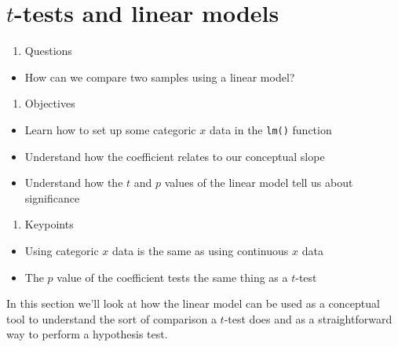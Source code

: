 \documentclass[
]{book}
\providecommand{\tightlist}{%
  \setlength{\itemsep}{0pt}\setlength{\parskip}{0pt}}
\begin{document}
\hypertarget{t-tests-and-linear-models}{%
\chapter{\texorpdfstring{\(t\)-tests and linear models}{t-tests and linear models}}\label{t-tests-and-linear-models}}

\begin{enumerate}
\def\labelenumi{\arabic{enumi}.}
\tightlist
\item
  Questions
\end{enumerate}

\begin{itemize}
\tightlist
\item
  How can we compare two samples using a linear model?
\end{itemize}

\begin{enumerate}
\def\labelenumi{\arabic{enumi}.}
\setcounter{enumi}{1}
\tightlist
\item
  Objectives
\end{enumerate}

\begin{itemize}
\tightlist
\item
  Learn how to set up some categoric \(x\) data in the \texttt{lm()} function
\item
  Understand how the coefficient relates to our conceptual slope
\item
  Understand how the \(t\) and \(p\) values of the linear model tell us about significance
\end{itemize}

\begin{enumerate}
\def\labelenumi{\arabic{enumi}.}
\setcounter{enumi}{2}
\tightlist
\item
  Keypoints
\end{enumerate}

\begin{itemize}
\tightlist
\item
  Using categoric \(x\) data is the same as using continuous \(x\) data
\item
  The \(p\) value of the coefficient tests the same thing as a \(t\)-test
\end{itemize}

In this section we'll look at how the linear model can be used as a conceptual tool to understand the sort of comparison a \(t\)-test does and as a straightforward way to perform a hypothesis test.
\end{document}
